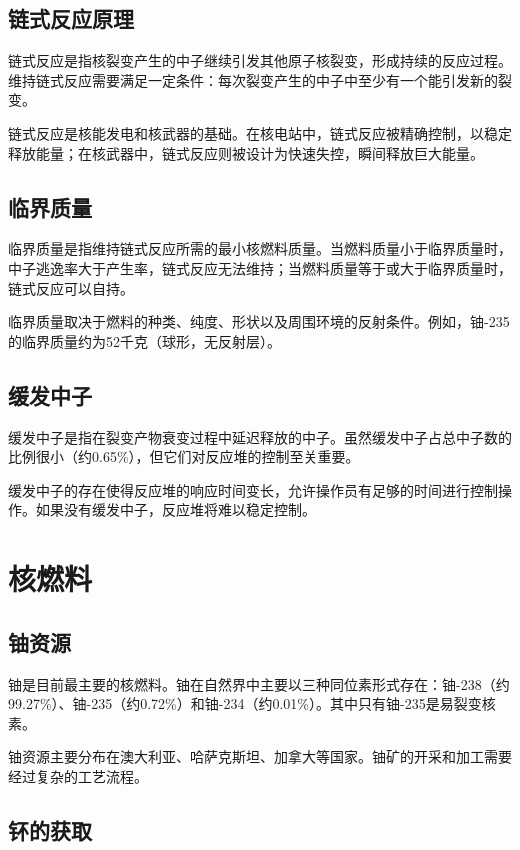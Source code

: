 \documentclass[12pt,UTF8]{ctexbook}
\begin{document}
\section{链式反应原理}

链式反应是指核裂变产生的中子继续引发其他原子核裂变，形成持续的反应过程。维持链式反应需要满足一定条件：每次裂变产生的中子中至少有一个能引发新的裂变。

链式反应是核能发电和核武器的基础。在核电站中，链式反应被精确控制，以稳定释放能量；在核武器中，链式反应则被设计为快速失控，瞬间释放巨大能量。

\section{临界质量}

临界质量是指维持链式反应所需的最小核燃料质量。当燃料质量小于临界质量时，中子逃逸率大于产生率，链式反应无法维持；当燃料质量等于或大于临界质量时，链式反应可以自持。

临界质量取决于燃料的种类、纯度、形状以及周围环境的反射条件。例如，铀-235的临界质量约为52千克（球形，无反射层）。

\section{缓发中子}

缓发中子是指在裂变产物衰变过程中延迟释放的中子。虽然缓发中子占总中子数的比例很小（约0.65\%），但它们对反应堆的控制至关重要。

缓发中子的存在使得反应堆的响应时间变长，允许操作员有足够的时间进行控制操作。如果没有缓发中子，反应堆将难以稳定控制。

\chapter{核燃料}

\section{铀资源}

铀是目前最主要的核燃料。铀在自然界中主要以三种同位素形式存在：铀-238（约99.27\%）、铀-235（约0.72\%）和铀-234（约0.01\%）。其中只有铀-235是易裂变核素。

铀资源主要分布在澳大利亚、哈萨克斯坦、加拿大等国家。铀矿的开采和加工需要经过复杂的工艺流程。

\section{钚的获取}
\end{document}
